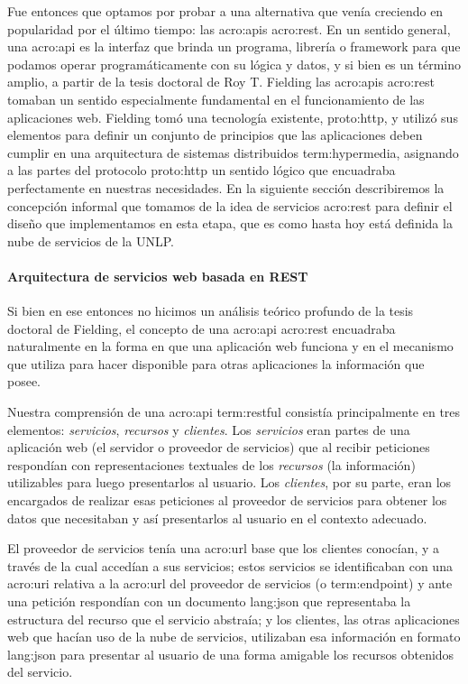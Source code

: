Fue entonces que optamos por probar a una alternativa que venía creciendo en popularidad por el último tiempo: las \glspl{acro:api} \gls{acro:rest}. En un sentido general, una \gls{acro:api} es la interfaz que brinda un programa, librería o framework para que podamos operar programáticamente con su lógica y datos, y si bien es un término amplio, a partir de la tesis doctoral de Roy T. Fielding \cite{tesis:fielding} las \glspl{acro:api} \gls{acro:rest} tomaban un sentido especialmente fundamental en el funcionamiento de las aplicaciones web. Fielding tomó una tecnología existente, \gls{proto:http}, y utilizó sus elementos para definir un conjunto de principios que las aplicaciones deben cumplir en una arquitectura de sistemas distribuidos \gls{term:hypermedia}, asignando a las partes del protocolo \gls{proto:http} un sentido lógico que encuadraba perfectamente en nuestras necesidades. En la siguiente sección describiremos la concepción informal que tomamos de la idea de servicios \gls{acro:rest} para definir el diseño que implementamos en esta etapa, que es como hasta hoy está definida la nube de servicios de la UNLP.


\paragraph{Arquitectura de servicios web basada en REST}

Si bien en ese entonces no hicimos un análisis teórico profundo de la tesis doctoral de Fielding, el concepto de una \gls{acro:api} \gls{acro:rest} encuadraba naturalmente en la forma en que una aplicación web funciona y en el mecanismo que utiliza para hacer disponible para otras aplicaciones la información que posee.

Nuestra comprensión de una \gls{acro:api} \gls{term:restful} consistía principalmente en tres elementos: \textit{servicios}, \textit{recursos} y \textit{clientes}. Los \textit{servicios} eran partes de una aplicación web (el servidor o proveedor de servicios) que al recibir peticiones respondían con representaciones textuales de los \textit{recursos} (la información) utilizables para luego presentarlos al usuario. Los \textit{clientes}, por su parte, eran los encargados de realizar esas peticiones al proveedor de servicios para obtener los datos que necesitaban y así presentarlos al usuario en el contexto adecuado.

El proveedor de servicios tenía una \gls{acro:url} base que los clientes conocían, y a través de la cual accedían a sus servicios; estos servicios se identificaban con una \gls{acro:uri} relativa a la \gls{acro:url} del proveedor de servicios (o \gls{term:endpoint}) y ante una petición respondían con un documento \gls{lang:json} que representaba la estructura del recurso que el servicio abstraía; y los clientes, las otras aplicaciones web que hacían uso de la nube de servicios, utilizaban esa información en formato \gls{lang:json} para presentar al usuario de una forma amigable los recursos obtenidos del servicio.


